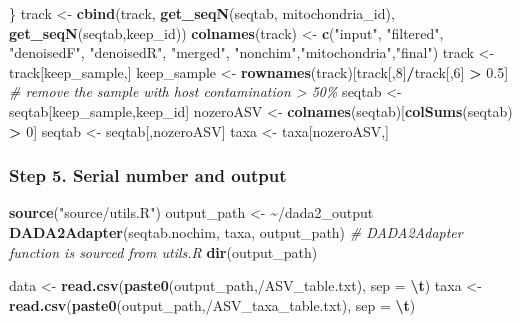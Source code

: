 \documentclass[
]{article}
\newenvironment{Shaded}{\begin{snugshade}}{\end{snugshade}}
\newcommand{\AttributeTok}[1]{\textcolor[rgb]{0.13,0.29,0.53}{#1}}
\newcommand{\CommentTok}[1]{\textcolor[rgb]{0.56,0.35,0.01}{\textit{#1}}}
\newcommand{\DecValTok}[1]{\textcolor[rgb]{0.00,0.00,0.81}{#1}}
\newcommand{\FloatTok}[1]{\textcolor[rgb]{0.00,0.00,0.81}{#1}}
\newcommand{\FunctionTok}[1]{\textcolor[rgb]{0.13,0.29,0.53}{\textbf{#1}}}
\newcommand{\NormalTok}[1]{#1}
\newcommand{\OtherTok}[1]{\textcolor[rgb]{0.56,0.35,0.01}{#1}}
\newcommand{\SpecialCharTok}[1]{\textcolor[rgb]{0.81,0.36,0.00}{\textbf{#1}}}
\newcommand{\StringTok}[1]{\textcolor[rgb]{0.31,0.60,0.02}{#1}}
\begin{document}
\begin{Shaded}
\begin{Highlighting}[]
\NormalTok{\}}
\NormalTok{track }\OtherTok{\textless{}{-}} \FunctionTok{cbind}\NormalTok{(track, }\FunctionTok{get\_seqN}\NormalTok{(seqtab, mitochondria\_id), }\FunctionTok{get\_seqN}\NormalTok{(seqtab,keep\_id))}
\FunctionTok{colnames}\NormalTok{(track) }\OtherTok{\textless{}{-}}  \FunctionTok{c}\NormalTok{(}\StringTok{"input"}\NormalTok{, }\StringTok{"filtered"}\NormalTok{, }\StringTok{"denoisedF"}\NormalTok{, }\StringTok{"denoisedR"}\NormalTok{, }\StringTok{"merged"}\NormalTok{, }\StringTok{"nonchim"}\NormalTok{,}\StringTok{"mitochondria"}\NormalTok{,}\StringTok{"final"}\NormalTok{)}
\NormalTok{track }\OtherTok{\textless{}{-}}\NormalTok{ track[keep\_sample,]}
\NormalTok{keep\_sample }\OtherTok{\textless{}{-}} \FunctionTok{rownames}\NormalTok{(track)[track[,}\DecValTok{8}\NormalTok{]}\SpecialCharTok{/}\NormalTok{track[,}\DecValTok{6}\NormalTok{] }\SpecialCharTok{\textgreater{}} \FloatTok{0.5}\NormalTok{]  }\CommentTok{\# remove the sample with host contamination \textgreater{} 50\%}
\NormalTok{seqtab }\OtherTok{\textless{}{-}}\NormalTok{ seqtab[keep\_sample,keep\_id]}
\NormalTok{nozeroASV }\OtherTok{\textless{}{-}} \FunctionTok{colnames}\NormalTok{(seqtab)[}\FunctionTok{colSums}\NormalTok{(seqtab) }\SpecialCharTok{\textgreater{}} \DecValTok{0}\NormalTok{]}
\NormalTok{seqtab }\OtherTok{\textless{}{-}}\NormalTok{ seqtab[,nozeroASV]}
\NormalTok{taxa }\OtherTok{\textless{}{-}}\NormalTok{ taxa[nozeroASV,]}
\end{Highlighting}
\end{Shaded}

\hypertarget{step-5.-serial-number-and-output}{%
\subsubsection{Step 5. Serial number and
output}\label{step-5.-serial-number-and-output}}

\begin{Shaded}
\begin{Highlighting}[]
\FunctionTok{source}\NormalTok{(}\StringTok{"source/utils.R"}\NormalTok{)}
\NormalTok{output\_path }\OtherTok{\textless{}{-}} \StringTok{\textquotesingle{}\textasciitilde{}/dada2\_output\textquotesingle{}}
\FunctionTok{DADA2Adapter}\NormalTok{(seqtab.nochim, taxa, output\_path)  }\CommentTok{\# DADA2Adapter function is sourced from utils.R}
\FunctionTok{dir}\NormalTok{(output\_path)}

\NormalTok{data }\OtherTok{\textless{}{-}} \FunctionTok{read.csv}\NormalTok{(}\FunctionTok{paste0}\NormalTok{(output\_path,}\StringTok{\textquotesingle{}/ASV\_table.txt\textquotesingle{}}\NormalTok{), }\AttributeTok{sep =} \StringTok{\textquotesingle{}}\SpecialCharTok{\textbackslash{}t}\StringTok{\textquotesingle{}}\NormalTok{)}
\NormalTok{taxa }\OtherTok{\textless{}{-}} \FunctionTok{read.csv}\NormalTok{(}\FunctionTok{paste0}\NormalTok{(output\_path,}\StringTok{\textquotesingle{}/ASV\_taxa\_table.txt\textquotesingle{}}\NormalTok{), }\AttributeTok{sep =} \StringTok{\textquotesingle{}}\SpecialCharTok{\textbackslash{}t}\StringTok{\textquotesingle{}}\NormalTok{)}
\end{Highlighting}
\end{Shaded}
\end{document}
